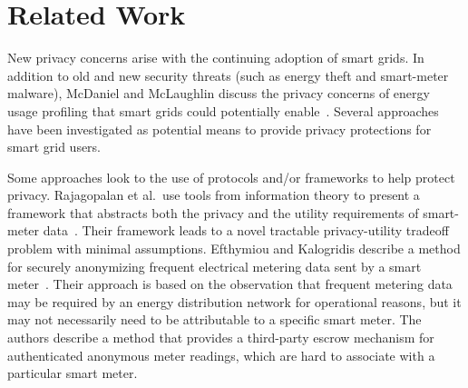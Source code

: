 \section{Related Work}
\label{sec:related}


New privacy concerns arise with the continuing adoption of smart
grids. In addition to old and new security threats (such as energy
theft and smart-meter malware), McDaniel and McLaughlin discuss the
privacy concerns of energy usage profiling that smart grids could
potentially enable~\cite{mcdaniel2009security}. Several approaches
have been investigated as potential means to provide privacy
protections for smart grid users.

Some approaches look to the use of protocols and/or frameworks to help
protect privacy. Rajagopalan et al.\ use tools from information theory
to present a framework that abstracts both the privacy and the utility
requirements of smart-meter
data~\cite{rajagopalan2011smart,sankar2013smart}. Their framework
leads to a novel tractable privacy-utility tradeoff problem with
minimal assumptions. Efthymiou and Kalogridis describe a method for
securely anonymizing frequent electrical metering data sent by a smart
meter~\cite{efthymiou2010smart}. Their approach is based on the
observation that frequent metering data may be required by an energy
distribution network for operational reasons, but it may not
necessarily need to be attributable to a specific smart meter. The
authors describe a method that provides a third-party escrow mechanism
for authenticated anonymous meter readings, which are hard to
associate with a particular smart meter.

